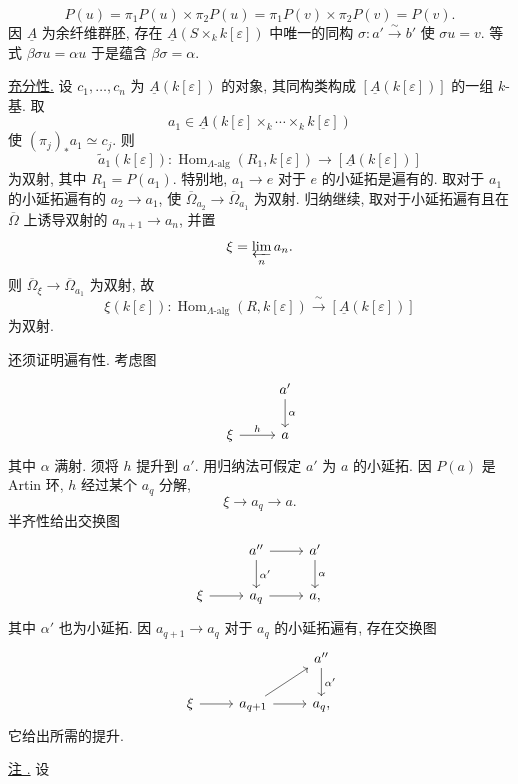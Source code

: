 
\[
 P(u)=\pi_1P(u)\times\pi_2P(u)
     =\pi_1P(v)\times\pi_2P(v)=P(v).
\]
因 $\underline A$ 为余纤维群胚, 存在 $\underline A(S\times_k k[\varepsilon])$
中唯一的同构 $\sigma:a'\xrightarrow{\sim}b'$ 使 $\sigma u=v$.
等式 $\beta\sigma u=\alpha u$ 于是蕴含 $\beta\sigma=\alpha$.

\underline{充分性.}
设 $c_1,\ldots,c_n$ 为 $\underline A(k[\varepsilon])$ 的对象,
其同构类构成 $[\underline A(k[\varepsilon])]$ 的一组 $k$-基.
取
\[
 a_1\in\underline A(
 k[\varepsilon]\times_k\cdots\times_k k[\varepsilon])
\]
使 $(\pi_j)_*a_1\simeq c_j$. 则
\[
 \widetilde a_1(k[\varepsilon]):
 \operatorname{Hom}_{\Lambda\text{-alg}}(R_1,k[\varepsilon])
 \longrightarrow[\underline A(k[\varepsilon])]
\]
为双射, 其中 $R_1=P(a_1)$. 特别地, $a_1\longrightarrow e$
对于 $e$ 的小延拓是遍有的. 取对于 $a_1$ 的小延拓遍有的
$a_2\longrightarrow a_1$, 使 $\overline\Omega_{a_2}\longrightarrow\overline\Omega_{a_1}$
为双射. 归纳继续, 取对于小延拓遍有且在 $\overline\Omega$ 上诱导双射的
$a_{n+1}\longrightarrow a_n$, 并置
\[
 \xi=\varprojlim_n a_n.
\]
则 $\overline\Omega_\xi\longrightarrow\overline\Omega_{a_1}$ 为双射, 故
\[
 \xi(k[\varepsilon]):
 \operatorname{Hom}_{\Lambda\text{-alg}}(R,k[\varepsilon])
 \xrightarrow{\ \sim\ }
 [\underline A(k[\varepsilon])]
\]
为双射.

还须证明遍有性. 考虑图
\[
\begin{tikzcd}
& a' \arrow[d,"\alpha"] \\
\xi \arrow[r,"h"] & a
\end{tikzcd}
\]
其中 $\alpha$ 满射. 须将 $h$ 提升到 $a'$.
用归纳法可假定 $a'$ 为 $a$ 的小延拓. 因 $P(a)$ 是 Artin 环,
$h$ 经过某个 $a_q$ 分解,
\[
 \xi\longrightarrow a_q\longrightarrow a.
\]
半齐性给出交换图
\[
\begin{tikzcd}
& a'' \arrow[r] \arrow[d,"\alpha'"] & a' \arrow[d,"\alpha"] \\
\xi \arrow[r] & a_q \arrow[r] & a,
\end{tikzcd}
\]
其中 $\alpha'$ 也为小延拓. 因 $a_{q+1}\longrightarrow a_q$
对于 $a_q$ 的小延拓遍有, 存在交换图
\[
\begin{tikzcd}
& & a'' \arrow[d,"\alpha'"] \\
\xi \arrow[r] & a_{q+1} \arrow[r] \arrow[ur] & a_q,
\end{tikzcd}
\]
它给出所需的提升.

\underline{注 .} 设


